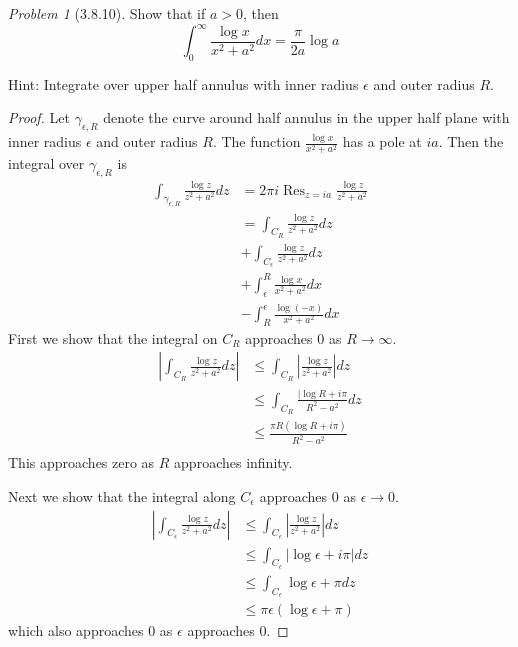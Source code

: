 \documentclass[10pt]{article}
\DeclareMathOperator{\Res}{Res}
\theoremstyle{remark}
\newtheorem{problem}{Problem}
\theoremstyle{remark}
\begin{document}
\begin{problem}[3.8.10]
  Show that if $a>0$, then
  \[
    \int_0^\infty\frac{\log x}{x^2+a^2}dx=\frac{\pi}{2a}\log a
  \]

  Hint: Integrate over upper half annulus with inner radius $\epsilon$ and outer
  radius $R$.
\end{problem}

\begin{proof}
  Let $\gamma_{\epsilon,R}$ denote the curve around half annulus in the upper half plane with
  inner radius $\epsilon$ and outer radius $R$. The function $\frac{\log x}{x^2+a^2}$ has
  a pole at $ia$. Then the integral over $\gamma_{\epsilon,R}$ is
  \begin{align*}
    \int_{\gamma_{\epsilon,R}}\frac{\log z}{z^2+a^2} dz&= 2\pi i\Res_{z=ia}\frac{\log z}{z^2+a^2}\\
                                                    &= \int_{C_R}\frac{\log z}{z^2+a^2}dz \\
                                                    &+ \int_{C_\epsilon}\frac{\log z}{z^2+a^2}dz \\
                                                    &+ \int_\epsilon^R \frac{\log x}{x^2+a^2}dx\\
                                                    &-\int_{R}^{\epsilon}\frac{\log (-x)}{x^2+a^2}dx
  \end{align*}
  First we show that the integral on $C_R$ approaches $0$ as $R\rightarrow\infty$.
  \begin{align*}
    |\int_{C_R}\frac{\log z}{z^2+a^2}dz| &\leq \int_{C_R}|\frac{\log z}{z^2+a^2}|dz\\
                                    &\leq \int_{C_R}\frac{|\log R+i\pi}{R^2-a^2}dz\\
                                    &\leq \frac{\pi R(\log R+i\pi)}{R^2-a^2}\\
  \end{align*}
  This approaches zero as $R$ approaches infinity.

  Next we show that the integral along $C_\epsilon$ approaches $0$ as $\epsilon\rightarrow 0$.
  \begin{align*}
    |\int_{C_\epsilon}\frac{\log z}{z^2+a^2}dz| & \leq\int_{C_\epsilon}|\frac{\log z}{z^2+a^2}|dz \\
                                   &\leq\int_{C_\epsilon}|\log \epsilon + i\pi |dz\\
                                   &\leq\int_{C_\epsilon}\log \epsilon + \pi dz\\
                                   &\leq\pi\epsilon(\log \epsilon+\pi)
  \end{align*}
  which also approaches $0$ as $\epsilon$ approaches $0$.
  

\end{proof}
\end{document}
